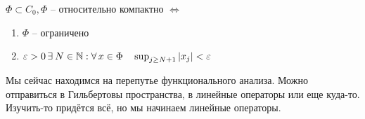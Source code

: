 \documentclass[document]{subfiles}
\begin{document}
\begin{statement}
    $\Phi \subset C_0, \Phi$  -- относительно компактно $\Leftrightarrow$ 
    \begin{enumerate}
        \item $\Phi$ -- ограничено \\
        \item $\varepsilon > 0 \, \exists N \in \bN : \forall x \in \Phi \quad \sup_{j \geq N+1} |x_j| < \varepsilon $
    \end{enumerate}
\end{statement}
Мы сейчас находимся на перепутье функционального анализа. Можно отправиться в Гильбертовы пространства, в линейные операторы или еще куда-то. Изучить-то придётся всё, но
мы начинаем линейные операторы. 
\end{document}
